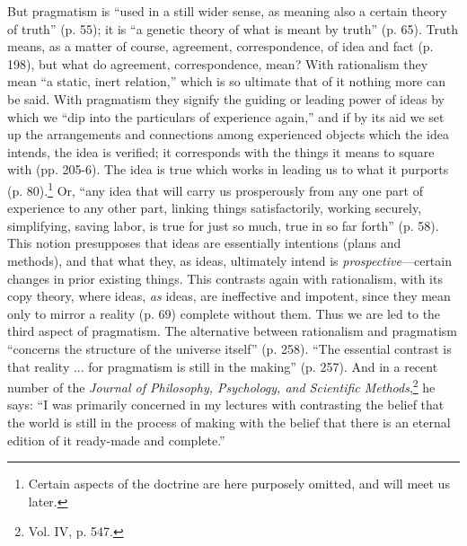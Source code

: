 \documentclass[12pt]{article}
\begin{document}
But pragmatism is ``used in a still wider sense, as meaning also a
certain theory of truth'' (p. 55);
it is ``a genetic theory of what is meant by truth'' (p. 65). Truth
means, as a matter of course, agreement, correspondence, of idea and
fact (p. 198), but what do agreement, correspondence, mean? With
rationalism they mean ``a static, inert relation,'' which is so ultimate
that of it nothing more can be said. With pragmatism they signify the
guiding or leading power of ideas by which we ``dip into the
particulars of experience again,'' and if by its aid we set up the
arrangements and connections among experienced objects which the idea
intends, the idea is verified; it corresponds with the things it means
to square with (pp. 205-6). The idea is true which works in leading us
to what it purports (p. 80).\footnote{Certain aspects of the doctrine are here purposely
omitted, and will meet us later.} Or, ``any idea that will carry us
prosperously from any one part of experience to any other part,
linking things satisfactorily, working securely, simplifying, saving
labor, is true for just so much, true in so far forth'' (p. 58). This
notion presupposes that ideas are essentially intentions (plans and
methods), and that what they, as ideas, ultimately intend is
\emph{prospective}---certain changes in prior existing things. This
contrasts again with rationalism, with its copy theory, where ideas,
\emph{as} ideas, are ineffective and impotent, since they mean only to
mirror a reality (p. 69) complete without them. Thus we are led to the
third aspect of pragmatism. The alternative between rationalism and
pragmatism ``concerns the structure
of the universe itself'' (p. 258). ``The essential contrast is that
reality ... for pragmatism is still in the making'' (p. 257). And in a
recent number of the \emph{Journal of Philosophy, Psychology, and
Scientific Methods},\footnote{Vol. IV, p. 547.} he says: ``I was primarily concerned in my
lectures with contrasting the belief that the world is still in the
process of making with the belief that there is an eternal edition of
it ready-made and complete.''
\end{document}
